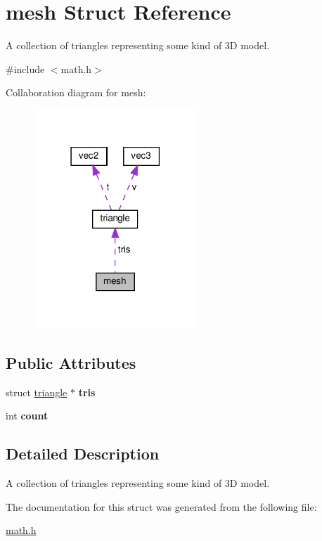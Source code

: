 \hypertarget{structmesh}{}\section{mesh Struct Reference}
\label{structmesh}


A collection of triangles representing some kind of 3D model.  




{\ttfamily \#include $<$math.\+h$>$}



Collaboration diagram for mesh\+:\nopagebreak
\begin{figure}[H]
\begin{center}
\leavevmode
\includegraphics[width=174pt]{structmesh__coll__graph}
\end{center}
\end{figure}
\subsection*{Public Attributes}
\begin{DoxyCompactItemize}
\item 
\mbox{\label{structmesh_a11dd56c45e9cb82c083ac3613c9cdadf}} 
struct \hyperlink{structtriangle}{triangle} $\ast$ {\bfseries tris}
\item 
\mbox{\label{structmesh_a1735083c139ec79acce73533f0b62be0}} 
int {\bfseries count}
\end{DoxyCompactItemize}


\subsection{Detailed Description}
A collection of triangles representing some kind of 3D model. 

The documentation for this struct was generated from the following file\+:\begin{DoxyCompactItemize}
\item 
\hyperlink{math_8h}{math.\+h}\end{DoxyCompactItemize}
